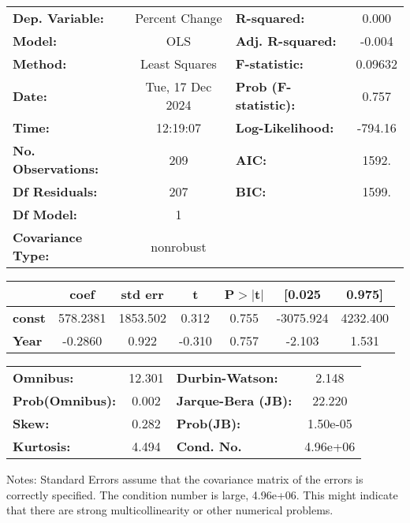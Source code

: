 \begin{center}
\begin{tabular}{lclc}
\toprule
\textbf{Dep. Variable:}    &  Percent Change  & \textbf{  R-squared:         } &     0.000   \\
\textbf{Model:}            &       OLS        & \textbf{  Adj. R-squared:    } &    -0.004   \\
\textbf{Method:}           &  Least Squares   & \textbf{  F-statistic:       } &   0.09632   \\
\textbf{Date:}             & Tue, 17 Dec 2024 & \textbf{  Prob (F-statistic):} &    0.757    \\
\textbf{Time:}             &     12:19:07     & \textbf{  Log-Likelihood:    } &   -794.16   \\
\textbf{No. Observations:} &         209      & \textbf{  AIC:               } &     1592.   \\
\textbf{Df Residuals:}     &         207      & \textbf{  BIC:               } &     1599.   \\
\textbf{Df Model:}         &           1      & \textbf{                     } &             \\
\textbf{Covariance Type:}  &    nonrobust     & \textbf{                     } &             \\
\bottomrule
\end{tabular}
\begin{tabular}{lcccccc}
               & \textbf{coef} & \textbf{std err} & \textbf{t} & \textbf{P$> |$t$|$} & \textbf{[0.025} & \textbf{0.975]}  \\
\midrule
\textbf{const} &     578.2381  &     1853.502     &     0.312  &         0.755        &    -3075.924    &     4232.400     \\
\textbf{Year}  &      -0.2860  &        0.922     &    -0.310  &         0.757        &       -2.103    &        1.531     \\
\bottomrule
\end{tabular}
\begin{tabular}{lclc}
\textbf{Omnibus:}       & 12.301 & \textbf{  Durbin-Watson:     } &    2.148  \\
\textbf{Prob(Omnibus):} &  0.002 & \textbf{  Jarque-Bera (JB):  } &   22.220  \\
\textbf{Skew:}          &  0.282 & \textbf{  Prob(JB):          } & 1.50e-05  \\
\textbf{Kurtosis:}      &  4.494 & \textbf{  Cond. No.          } & 4.96e+06  \\
\bottomrule
\end{tabular}
\end{center}

Notes: \newline
 [1] Standard Errors assume that the covariance matrix of the errors is correctly specified. \newline
 [2] The condition number is large, 4.96e+06. This might indicate that there are \newline
 strong multicollinearity or other numerical problems.